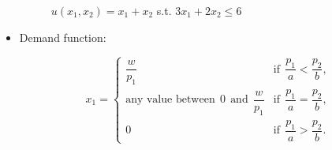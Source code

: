 \documentclass[
12pt, %
a4paper, %
onecolumn, %
portrait %
]{article}
\begin{document}
\begin{itemize}
\begin{figure}[H]
	\centering
	\caption{$u(x_1,x_2)=x_1+x_2$ s.t. $3x_1+2x_2\le 6$}
	\label{Fig.lable}
\end{figure}



\item Demand function:

\begin{equation*}
x_1=\begin{cases}
\dfrac{w}{p_1}&\text{if}\;\,\dfrac{p_1}{a}<\dfrac{p_2}{b},\\
\text{any value between}\;\,0\;\, \text{and}\;\, \dfrac{w}{p_1}&\text{if}\;\, \dfrac{p_1}{a}=\dfrac{p_2}{b},\\
0&\text{if}\;\,\dfrac{p_1}{a}>\dfrac{p_2}{b}.
\end{cases}
\end{equation*}
   

\end{itemize}
\end{document}
